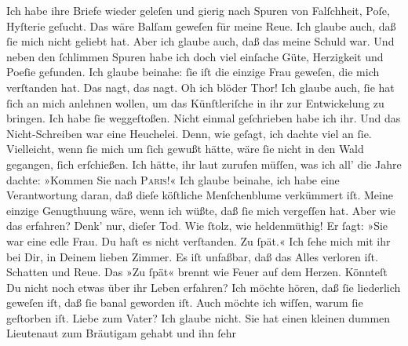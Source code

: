 {\begin{ledgroupsized}[t]{13cm}
           \pstart
           Ich habe ihre Briefe wieder geleſen und gierig nach Spuren von Falſchheit, Poſe,
               Hyſterie geſucht. Das wäre Balſam geweſen für meine Reue. Ich glaube auch, daß ſie
               mich nicht geliebt hat. Aber ich glaube auch, daß das meine Schuld war. Und neben den
                  {\pb}ſchlimmen Spuren habe ich doch viel einſache
               Güte, Herzigkeit und Poeſie gefunden. Ich glaube beinahe: ſie iſt die einzige Frau
               geweſen, die mich \strikeout{\textcolor{gray}{ver}} verſtanden hat. Das nagt, das nagt. Oh ich blöder Thor!\pend
           \pstart
           Ich glaube auch, ſie hat ſich an mich anlehnen wollen, um das Künſtleriſche in ihr
               zur Entwickelung zu bringen. Ich habe ſie weggeſtoßen. Nicht einmal geſchrieben habe
               ich ihr. Und das Nicht-Schreiben war eine Heuchelei. Denn, wie geſagt, ich dachte
               viel an ſie. Vielleicht, wenn ſie mich um ſich gewußt hätte, wäre ſie nicht in den
               Wald {\pb}gegangen, ſich erſchießen. Ich hätte, ihr laut
               zurufen müſſen, was ich all’ die Jahre dachte: »Kommen Sie nach \textsc{Paris}!« Ich glaube beinahe, ich habe eine Verantwortung daran, daß dieſe köſtliche
                  Menſchenblume verkümmert
               iſt. Meine einzige Genugthuung wäre, wenn ich wüßte, daß ſie mich vergeſſen hat. Aber
               wie das erfahren?\pend
           \pstart
           Denk’ nur, dieſer Tod\textcolor{gray}{.} Wie ſtolz, wie heldenmüthig! Er ſagt: »Sie
               war eine edle Frau. Du haſt es nicht verſtanden. Zu ſpät.«\pend
           \pstart
           Ich ſehe mich mit ihr bei Dir, in Deinem lieben {\pb}Zimmer. Es iſt unfaßbar, daß das Alles verloren iſt. Schatten und Reue. Das »Zu
               ſpät« brennt wie Feuer auf dem Herzen.\pend
           \pstart
           Könnteſt Du nicht noch etwas über ihr Leben erfahren? Ich möchte hören, daß ſie liederlich geweſen iſt, daß
               ſie banal geworden iſt. Auch möchte ich wiſſen, \strikeout{\textcolor{gray}{×}} warum ſie geſtorben iſt. Liebe zum Vater? Ich glaube nicht. Sie hat einen kleinen dummen Lieutenaut zum Bräutigam gehabt und ihn ſehr

\end{ledgroupsized}}
